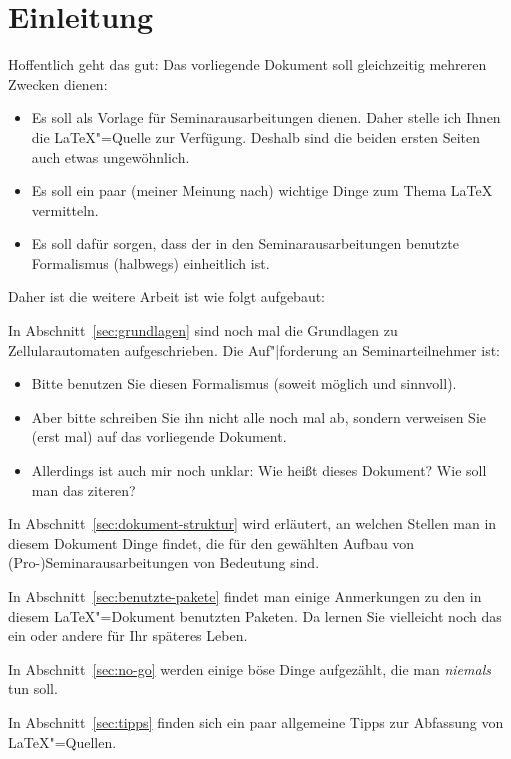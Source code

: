 \documentclass[11pt]{article}
\begin{document}
\clearpage

\section{Einleitung}

Hoffentlich geht das gut: Das vorliegende Dokument soll gleichzeitig mehreren
Zwecken dienen:
%
\begin{itemize}[noitemsep]
\item Es soll als Vorlage für Seminarausarbeitungen dienen.
  Daher stelle ich Ihnen die \LaTeX"=Quelle zur Verfügung.
  Deshalb sind die beiden ersten Seiten auch etwas ungewöhnlich.
\item Es soll ein paar (meiner Meinung nach) wichtige Dinge zum Thema \LaTeX{}
  vermitteln.
\item Es soll dafür sorgen, dass der in den Seminarausarbeitungen benutzte
  Formalismus (halbwegs) einheitlich ist.
\end{itemize}
%
Daher ist die weitere Arbeit ist wie folgt aufgebaut: 

In Abschnitt~\ref{sec:grundlagen} sind noch mal die Grundlagen zu
Zellularautomaten aufgeschrieben. Die Auf"|forderung an Seminarteilnehmer ist:
%
\begin{itemize}[noitemsep]
\item Bitte benutzen Sie diesen Formalismus (soweit möglich und sinnvoll).
\item Aber bitte schreiben Sie ihn nicht alle noch mal ab, sondern verweisen
  Sie (erst mal) auf das vorliegende Dokument.
\item Allerdings ist auch mir noch unklar: Wie heißt dieses Dokument? Wie soll
  man das ziteren?
\end{itemize}
%
In Abschnitt~\ref{sec:dokument-struktur} wird erläutert, an welchen Stellen
man in diesem Dokument Dinge findet, die für den gewählten Aufbau von
(Pro-)Seminarausarbeitungen von Bedeutung sind.

In Abschnitt~\ref{sec:benutzte-pakete} findet man einige Anmerkungen zu den in
diesem \LaTeX"=Dokument benutzten Paketen. Da lernen Sie vielleicht noch das
ein oder andere für Ihr späteres Leben.

In Abschnitt~\ref{sec:no-go} werden einige böse Dinge aufgezählt, die man
\emph{niemals} tun soll.

In Abschnitt~\ref{sec:tipps} finden sich ein paar allgemeine Tipps zur
Abfassung von \LaTeX"=Quellen.
\end{document}
